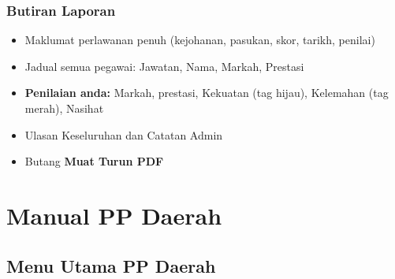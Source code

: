 \documentclass[12pt,a4paper]{report}
\newcommand{\btn}[1]{\colorbox{primaryblue!10}{\textcolor{primaryblue}{\textbf{#1}}}}
\begin{document}
\subsection{Butiran Laporan}
\begin{itemize}[label=\textcolor{pbnpblue}{\faChevronRight}]
  \item Maklumat perlawanan penuh (kejohanan, pasukan, skor, tarikh, penilai)
  \item Jadual semua pegawai: Jawatan, Nama, Markah, Prestasi
  \item \textbf{Penilaian anda:} Markah, prestasi, \textcolor{successgreen}{Kekuatan (tag hijau)}, \textcolor{dangered}{Kelemahan (tag merah)}, Nasihat
  \item Ulasan Keseluruhan dan Catatan Admin
  \item Butang \btn{Muat Turun PDF}
\end{itemize}

\chapter{Manual PP Daerah}

\section{Menu Utama PP Daerah}
\end{document}
